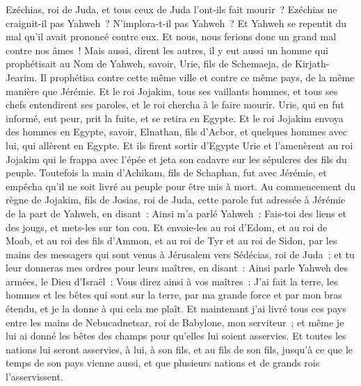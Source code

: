 \begin{multicols}{2}
Ezéchias, roi de Juda, et tous ceux de Juda l'ont-ils fait mourir~? Ezéchias ne craignit-il pas Yahweh~? N'implora-t-il pas Yahweh~? Et Yahweh se repentit du mal qu'il avait prononcé contre eux. Et nous, nous ferions donc un grand mal contre nos âmes~!
Mais aussi, dirent les autres, il y eut aussi un homme qui prophétisait au Nom de Yahweh, savoir, Urie, fils de Schemaeja, de Kirjath-Jearim. Il prophétisa contre cette même ville et contre ce même pays, de la même manière que Jérémie.
Et le roi Jojakim, tous ses vaillants hommes, et tous ses chefs entendirent ses paroles, et le roi chercha à le faire mourir. Urie, qui en fut informé, eut peur, prit la fuite, et se retira en Egypte.
Et le roi Jojakim envoya des hommes en Egypte, savoir, Elnathan, fils d'Acbor, et quelques hommes avec lui, qui allèrent en Egypte.
Et ils firent sortir d'Egypte Urie et l'amenèrent au roi Jojakim qui le frappa avec l'épée et jeta son cadavre sur les sépulcres des fils du peuple.
Toutefois la main d'Achikam, fils de Schaphan, fut avec Jérémie, et empêcha qu'il ne soit livré au peuple pour être mis à mort.
\VerseOne{}Au commencement du règne de Jojakim, fils de Josias, roi de Juda, cette parole fut adressée à Jérémie de la part de Yahweh, en disant~:
Ainsi m'a parlé Yahweh~: Fais-toi des liens et des jougs, et mets-les sur ton cou.
Et envoie-les au roi d'Edom, et au roi de Moab, et au roi des fils d'Ammon, et au roi de Tyr et au roi de Sidon, par les mains des messagers qui sont venus à Jérusalem vers Sédécias, roi de Juda~;
et tu leur donneras mes ordres pour leurs maîtres, en disant~: Ainsi parle Yahweh des armées, le Dieu d'Israël~: Vous direz ainsi à vos maîtres~:
J'ai fait la terre, les hommes et les bêtes qui sont sur la terre, par ma grande force et par mon bras étendu, et je la donne à qui cela me plaît.
Et maintenant j'ai livré tous ces pays entre les mains de Nebucadnetsar, roi de Babylone, mon serviteur~; et même je lui ai donné les bêtes des champs pour qu'elles lui soient asservies.
Et toutes les nations lui seront asservies, à lui, à son fils, et au fils de son fils, jusqu'à ce que le temps de son pays vienne aussi, et que plusieurs nations et de grands rois l'asservissent.

\end{multicols}
